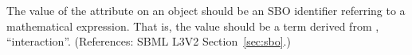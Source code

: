 The value of the attribute  on an \Event object should be
an SBO identifier referring to a mathematical expression.  That is, the
value should be a term derived from \sbointeractionID,
``interaction''.  (References: SBML L3V2 Section~\ref{sec:sbo}.)
